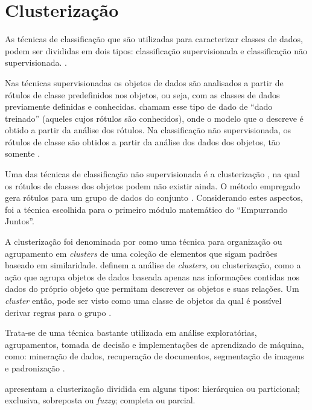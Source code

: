 \chapter{Clusterização} \label{cap:clusterizacao}

As técnicas de classificação que são utilizadas para caracterizar classes de dados, podem
ser divididas em dois tipos: classificação supervisionada e classificação não supervisionada. \cite{tan2013data, han2011data, clustering_review}.

Nas técnicas supervisionadas os objetos de dados são analisados a partir de rótulos de classe predefinidos nos objetos, ou seja, 
com as classes de dados previamente definidas e conhecidas.  chamam esse tipo de dado de ``dado treinado''
(aqueles cujos rótulos são conhecidos), onde o modelo que o descreve é obtido a partir da análise dos rótulos.
Na classificação não supervisionada, os rótulos de classe são obtidos a partir da análise dos dados dos objetos, tão somente \cite{tan2013data}.

Uma das técnicas de classificação não supervisionada é a clusterização \cite{clustering_review, tan2013data}, na qual os rótulos de classes dos objetos 
podem não existir ainda. O método empregado gera rótulos para um grupo de dados do conjunto \cite{han2011data}. Considerando estes aspectos, 
foi a técnica escolhida para o primeiro módulo matemático do ``Empurrando Juntos''. 

A clusterização foi denominada por  como uma técnica para organização ou agrupamento em \textit{clusters} 
de uma coleção de elementos que sigam padrões baseado em similaridade.
 definem a análise de \textit{clusters}, ou clusterização, como a ação que agrupa objetos de dados
baseada apenas nas informações contidas nos dados do próprio objeto que permitam descrever os objetos e suas relações. Um \textit{cluster}
então, pode ser visto como uma classe de objetos da qual é possível derivar regras para o grupo \cite{han2011data}.

Trata-se de uma técnica bastante utilizada em análise exploratórias, agrupamentos, 
tomada de decisão e implementações de aprendizado de máquina, como:
mineração de dados, recuperação de documentos, segmentação de imagens e padronização \cite{clustering_review}.

 apresentam a clusterização dividida em alguns tipos: 
hierárquica ou particional; exclusiva, sobreposta ou \textit{fuzzy}; completa ou parcial.

